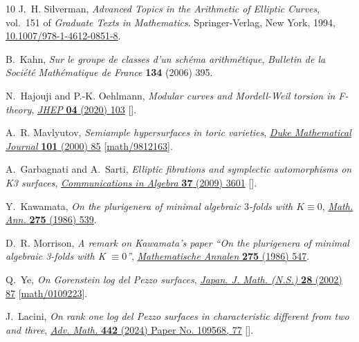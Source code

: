 \documentclass[11pt]{amsart}
\theoremstyle{definition}
\theoremstyle{definition}
\theoremstyle{remark}
\theoremstyle{remark}
\theoremstyle{definition}
\theoremstyle{conjecture}
\begin{document}
\begin{thebibliography}{10}
J.~H. Silverman, \emph{Advanced Topics in the Arithmetic of Elliptic Curves},
  vol.~151 of \emph{Graduate Texts in Mathematics}. Springer-Verlag, New York,
  1994,
  \href{https://doi.org/10.1007/978-1-4612-0851-8}{10.1007/978-1-4612-0851-8}.

B.~Kahn, \emph{Sur le groupe de classes d'un sch\'ema arithm\'etique},
  {\emph{Bulletin de la Soci\'et\'e Math\'ematique de France} {\bfseries 134}
  (2006) 395}.

N.~Hajouji and P.-K. Oehlmann, \emph{{Modular curves and Mordell-Weil torsion
  in F-theory}}, \href{https://doi.org/10.1007/JHEP04(2020)103}{\emph{JHEP}
  {\bfseries 04} (2020) 103}
  [\href{https://arxiv.org/abs/1910.04095}{{}}].

A.~R. Mavlyutov, \emph{Semiample hypersurfaces in toric varieties},
  \href{https://doi.org/10.1215/S0012-7094-00-10114-7}{\emph{Duke Mathematical
  Journal} {\bfseries 101} (2000) 85}
  [\href{https://arxiv.org/abs/math/9812163}{{\ttfamily math/9812163}}].

A.~Garbagnati and A.~Sarti, \emph{Elliptic fibrations and symplectic
  automorphisms on {K}3 surfaces},
  \href{https://doi.org/10.1080/00927870902828785}{\emph{Communications in
  Algebra} {\bfseries 37} (2009) 3601}
  [\href{https://arxiv.org/abs/0801.3992}{{}}].

Y.~Kawamata, \emph{On the plurigenera of minimal algebraic {$3$}-folds with {$K
  \equiv 0$}}, \href{https://doi.org/10.1007/BF01459135}{\emph{Math. Ann.}
  {\bfseries 275} (1986) 539}.

D.~R. Morrison, \emph{A remark on {K}awamata's paper ``{O}n the plurigenera of
  minimal algebraic 3-folds with {K} {$\equiv 0$}''},
  \href{https://doi.org/10.1007/BF01459136}{\emph{Mathematische Annalen}
  {\bfseries 275} (1986) 547}.

Q.~Ye, \emph{On {G}orenstein log del {P}ezzo surfaces},
  \href{https://doi.org/10.4099/math1924.28.87}{\emph{Japan. J. Math. (N.S.)}
  {\bfseries 28} (2002) 87}
  [\href{https://arxiv.org/abs/math/0109223}{{\ttfamily math/0109223}}].

J.~Lacini, \emph{On rank one log del {P}ezzo surfaces in characteristic
  different from two and three},
  \href{https://doi.org/10.1016/j.aim.2024.109568}{\emph{Adv. Math.} {\bfseries
  442} (2024) Paper No. 109568, 77}
  [\href{https://arxiv.org/abs/2005.14544}{{}}].


\end{thebibliography}
\end{document}
